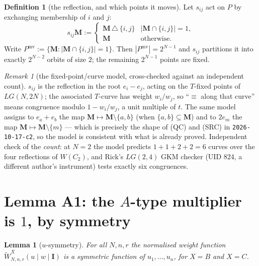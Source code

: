 \documentclass[11pt]{article}
\theoremstyle{plain}
\newtheorem{lem}[thm]{Lemma}
\theoremstyle{definition}
\newtheorem{defn}[thm]{Definition}
\theoremstyle{remark}
\newtheorem{rem}[thm]{Remark}
\theoremstyle{plain}
\newcommand{\bI}{\mathbf{I}}
\newcommand{\bM}{\mathbf{M}}
\newcommand{\sm}{\setminus}
\begin{document}
\begin{defn}[the reflection, and which points it moves]
Let $s_{ij}$ act on $P$ by exchanging membership of $i$ and $j$:
\[
  s_{ij}\bM:=\begin{cases}
    \bM\,\triangle\,\{i,j\} & |\bM\cap\{i,j\}|=1,\\
    \bM & \text{otherwise.}
  \end{cases}
\]
Write $P^{\mathrm{mv}}:=\{\bM:|\bM\cap\{i,j\}|=1\}$.  Then
$|P^{\mathrm{mv}}|=2^{N-1}$ and $s_{ij}$ partitions it into exactly $2^{N-2}$
orbits of size $2$; the remaining $2^{N-1}$ points are fixed.
\end{defn}

\begin{rem}[the fixed-point/curve model, cross-checked against an independent count]
$s_{ij}$ is the reflection in the root $e_i-e_j$, acting on the $T$-fixed points
of $LG(N,2N)$; the associated $T$-curve has weight $w_i/w_j$, so ``$\equiv$ along
that curve'' means congruence modulo $1-w_i/w_j$, a unit multiple of $t$.  The
same model assigns to $e_a+e_b$ the map $\bM\mapsto\bM\sm\{a,b\}$ (when
$\{a,b\}\subseteq\bM$) and to $2e_m$ the map $\bM\mapsto\bM\sm\{m\}$ --- which is
precisely the shape of (QC) and (SRC) in \texttt{2026-10-17-c2}, so the model is
consistent with what is already proved.  Independent check of the \emph{count}:
at $N=2$ the model predicts $1+1+2+2=6$ curves over the four reflections of
$W(C_2)$, and Rick's $LG(2,4)$ GKM checker (UID 824, a different author's
instrument) tests exactly six congruences.
\end{rem}

\section{Lemma A1: the $A$-type multiplier is $1$, by symmetry}
\label{sec:A1}

\begin{lem}[$u$-symmetry]\label{lem:sym}
For all $N,n,r$ the normalised weight function
$\widetilde{W}^X_{N,n,r}(u\mid w\mid\bI)$ is a symmetric function of
$u_1,\dots,u_n$, for $X=B$ and $X=C$.
\end{lem}
\end{document}
